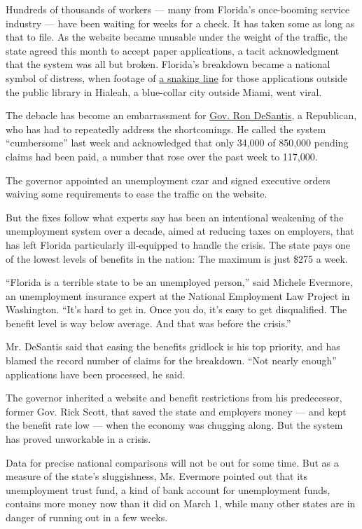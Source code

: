 Hundreds of thousands of workers --- many from Florida's once-booming
service industry --- have been waiting for weeks for a check. It has
taken some as long as that to file. As the website became unusable under
the weight of the traffic, the state agreed this month to accept paper
applications, a tacit acknowledgment that the system was all but broken.
Florida's breakdown became a national symbol of distress, when footage
of
\href{https://www.local10.com/news/local/2020/04/07/here-is-where-to-download-application-for-unemployment-benefits/}{a
snaking line} for those applications outside the public library in
Hialeah, a blue-collar city outside Miami, went viral.

The debacle has become an embarrassment for
\href{https://www.nytimes.com/2020/04/01/us/coronavirus-florida-de-santis-trump.html}{Gov.
Ron DeSantis}, a Republican, who has had to repeatedly address the
shortcomings. He called the system ``cumbersome'' last week and
acknowledged that only 34,000 of 850,000 pending claims had been paid, a
number that rose over the past week to 117,000.

The governor appointed an unemployment czar and signed executive orders
waiving some requirements to ease the traffic on the website.

But the fixes follow what experts say has been an intentional weakening
of the unemployment system over a decade, aimed at reducing taxes on
employers, that has left Florida particularly ill-equipped to handle the
crisis. The state pays one of the lowest levels of benefits in the
nation: The maximum is just \$275 a week.

``Florida is a terrible state to be an unemployed person,'' said Michele
Evermore, an unemployment insurance expert at the National Employment
Law Project in Washington. ``It's hard to get in. Once you do, it's easy
to get disqualified. The benefit level is way below average. And that
was before the crisis.''

Mr. DeSantis said that easing the benefits gridlock is his top priority,
and has blamed the record number of claims for the breakdown. ``Not
nearly enough'' applications have been processed, he said.

The governor inherited a website and benefit restrictions from his
predecessor, former Gov. Rick Scott, that saved the state and employers
money --- and kept the benefit rate low --- when the economy was
chugging along. But the system has proved unworkable in a crisis.

Data for precise national comparisons will not be out for some time. But
as a measure of the state's sluggishness, Ms. Evermore pointed out that
its unemployment trust fund, a kind of bank account for unemployment
funds, contains more money now than it did on March 1, while many other
states are in danger of running out in a few weeks.

